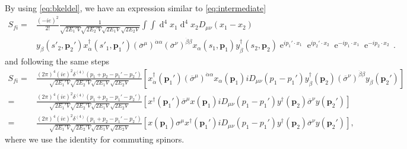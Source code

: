 By using \eqref{eq:bkeldel}, we have an expression similar to \eqref{eq:intermediate}
\begin{align}
  S_{fi}
=&\frac{\left( -ie \right)^{2}}{2!}\frac{1}{\sqrt{2E_1' V}\sqrt{2E_2' V}\sqrt{2E_1 V}\sqrt{2E_2 V}}
\int\int \operatorname{d}^4x_1 \operatorname{d}^4x_2
D_{\mu\nu} \left( x_1-x_2 \right)\nonumber\\
&y_{\beta}\left(s'_2,\mathbf{p}_2'\right)x^{\dagger}_{\dot{\alpha}}\left( s'_1,\mathbf{p}_1' \right)
\left( \overline{\sigma}^{\mu} \right)^{\dot{\alpha}\alpha}\left( \overline{\sigma}^{\nu} \right)^{\dot{\beta}\beta}
x_{\alpha}\left(s_1,\mathbf{p}_1\right)y^{\dagger}_{\dot{\beta}}\left( s_2,\mathbf{p}_2 \right)
\operatorname{e}^{i p_1'\cdot x_1}\operatorname{e}^{i p_2'\cdot x_2}
\operatorname{e}^{-i p_1\cdot x_1}\operatorname{e}^{-i p_2\cdot x_2}\,.
\end{align}
and following the same steps
\begin{align}
\label{eq:finalsfi}
      S_{fi}
    =&\frac{(2\pi)^4(ie)^2\delta^{(4)}\left(p_1+p_2-p_1'-p_2'\right) }{\sqrt{2 E_1'V}\sqrt{2 E_2'V}\sqrt{2 E_1V}\sqrt{2 E_2V}}
 \left[ x^{\dagger}_{\dot{\alpha}}(\mathbf{p}_1')\left( \overline{\sigma}^{\mu} \right)^{\dot{\alpha}\alpha}x_{\alpha}(\mathbf{p}_1)  i D_{\mu\nu}\left( p_1-p_1' \right)y^{\dagger}_{\dot{\beta}}(\mathbf{p}_2) \left( \overline{\sigma}^{\nu} \right)^{\dot{\beta}\beta}y_{\beta}(\mathbf{p}_2')\right] \nonumber\\
    =&\frac{(2\pi)^4(ie)^2\delta^{(4)}\left(p_1+p_2-p_1'-p_2'\right) }{\sqrt{2 E_1'V}\sqrt{2 E_2'V}\sqrt{2 E_1V}\sqrt{2 E_2V}}
 \left[ x^{\dagger}(\mathbf{p}_1') \overline{\sigma}^{\mu}x(\mathbf{p}_1)  i D_{\mu\nu}\left( p_1-p_1' \right)y^{\dagger}(\mathbf{p}_2) \overline{\sigma}^{\nu} y(\mathbf{p}_2')\right] \nonumber\\
    =&\frac{(2\pi)^4(ie)^2\delta^{(4)}\left(p_1+p_2-p_1'-p_2'\right) }{\sqrt{2 E_1'V}\sqrt{2 E_2'V}\sqrt{2 E_1V}\sqrt{2 E_2V}}
 \left[ x(\mathbf{p}_1) {\sigma}^{\mu}x^{\dagger}(\mathbf{p}_1')  i D_{\mu\nu}\left( p_1-p_1' \right)y^{\dagger}(\mathbf{p}_2) \overline{\sigma}^{\nu} y(\mathbf{p}_2')\right],
\end{align}
where we use the identity for commuting spinors.

